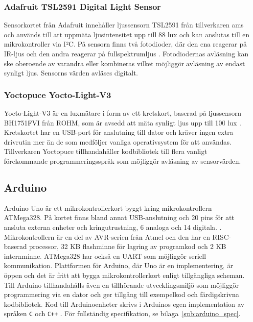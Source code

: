         \subsubsection{Adafruit TSL2591 Digital Light Sensor}
            \label{ssub:ada_tsl2591}
            Sensorkortet från Adafruit innehåller ljussensorn TSL2591 från tillverkaren ams och används till att uppmäta ljusintensitet upp till 88 lux och kan anslutas till en mikrokontroller via I²C. På sensorn finns två fotodioder, där den ena reagerar på IR-ljus och den andra reagerar på fullspektrumljus \cite{TSL2591}. Fotodiodernas avläsning kan ske oberoende av varandra eller kombineras vilket möjliggör avläsning av endast synligt ljus. Sensorns värden avläses digitalt.

        \subsubsection{Yoctopuce Yocto-Light-V3} %
        \label{sub:yocto}
            Yocto-Light-V3 är en luxmätare i form av ett kretskort, baserad på ljussensorn BH1751FVI från ROHM, som är avsedd att mäta synligt ljus upp till 100 lux \cite{yocto}. Kretskortet har en USB-port för anslutning till dator och kräver ingen extra drivrutin mer än de som medföljer vanliga operativsystem för att användas. Tillverkaren Yoctopuce tillhandahåller kodbibliotek till flera vanligt förekommande programmeringsspråk som möjliggör avläsning av sensorvärden.
    \newpage
    \subsection{Arduino} %
    \label{ssub:arduino_uno}
        Arduino Uno är ett mikrokontrollerkort byggt kring mikrokontrollern ATMega328. På kortet finns bland annat USB-anslutning och 20 pins för att ansluta externa enheter och kringutrustning, 6 analoga och 14 digitala. \cite{ard_internals}. Mikrokontrollern är en del av AVR-serien från Atmel och den har en RISC-baserad processor, 32 KB flashminne för lagring av programkod och 2 KB internminne. ATMega328 har också en UART som möjliggör seriell kommunikation. Plattformen för Arduino, där Uno är en implementering, är öppen och det är fritt att bygga mikrokontrollerkort enligt tillgängliga scheman. Till Arduino tillhandahålls även en tillhörande utvecklingsmiljö som möjliggör programmering via en dator och ger tillgång till exempelkod och färdigskrivna kodbibliotek. Kod till Arduinoenheter skrivs i Arduinos egen implementation av språken \texttt{C} och \texttt{C++} \cite{ard_c, ard_cplusplus}. För fullständig specifikation, se bilaga~\ref{sub:arduino_spec}.
